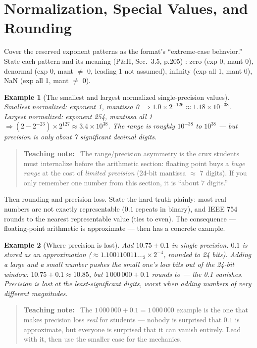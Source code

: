 \documentclass[11pt]{article}
\newtheorem{example}{Example}[section]
\newenvironment{teachingaside}{\begin{quote}\small\color{primary-gold}\textbf{Teaching note:}\ }{\end{quote}}
\begin{document}
\section{Normalization, Special Values, and Rounding}

Cover the reserved exponent patterns as the format's ``extreme-case behavior.'' State each pattern and its meaning (P\&H, Sec.~3.5, p.205) \cite{PattersonHennessy2017_computer_organization_design}: zero (exp 0, mant 0), denormal (exp 0, mant $\neq$ 0, leading 1 not assumed), infinity (exp all 1, mant 0), NaN (exp all 1, mant $\neq$ 0).

\begin{example}[The smallest and largest normalized single-precision values]
Smallest normalized: exponent 1, mantissa 0 $\Rightarrow 1.0 \times 2^{-126} \approx 1.18\times10^{-38}$. Largest normalized: exponent 254, mantissa all 1 $\Rightarrow (2-2^{-23}) \times 2^{127} \approx 3.4\times10^{38}$. The range is roughly $10^{-38}$ to $10^{38}$ --- but precision is only about 7 significant decimal digits.
\end{example}

\begin{teachingaside}
The range/precision asymmetry is the crux students must internalize before the arithmetic section: floating point buys a \emph{huge range} at the cost of \emph{limited precision} (24-bit mantissa $\approx$ 7 digits). If you only remember one number from this section, it is ``about 7 digits.''
\end{teachingaside}

Then rounding and precision loss. State the hard truth plainly: most real numbers are not exactly representable ($0.1$ repeats in binary), and IEEE 754 rounds to the nearest representable value (ties to even). The consequence --- floating-point arithmetic is approximate --- then has a concrete example.

\begin{example}[Where precision is lost]
Add $10.75 + 0.1$ in single precision. $0.1$ is stored as an approximation ($\approx 1.100110011\ldots_2 \times 2^{-4}$, rounded to 24 bits). Adding a large and a small number pushes the small one's low bits out of the 24-bit window: $10.75+0.1 \approx 10.85$, but $1\,000\,000 + 0.1$ rounds to  --- the 0.1 vanishes. Precision is lost at the least-significant digits, worst when adding numbers of very different magnitudes.
\end{example}

\begin{teachingaside}
The $1\,000\,000 + 0.1 = 1\,000\,000$ example is the one that makes precision loss \emph{real} for students --- nobody is surprised that $0.1$ is approximate, but everyone is surprised that it can vanish entirely. Lead with it, then use the smaller case for the mechanics.
\end{teachingaside}
\end{document}

